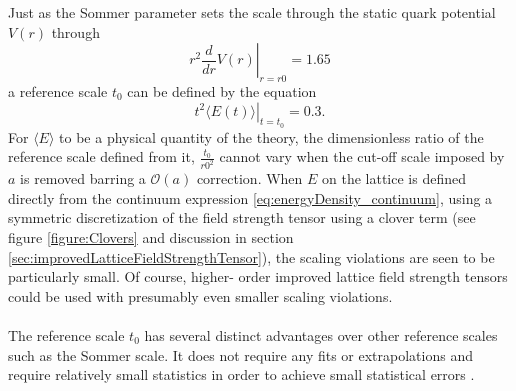 \documentclass[a4paper,10pt]{article}
\begin{document}
Just as the Sommer parameter sets the scale through the static quark potential $V(r)$ through
\begin{equation}
r^2\left.\frac{d}{d r} V(r)\right|_{r=r0} = 1.65
\end{equation}
a reference scale $t_0$ can be defined by the equation
\begin{equation}
\left.t^{2}\langle E(t)\rangle\right|_{t=t_{0}}=0.3.
\end{equation}
For $\langle E\rangle$ to be a physical quantity of the theory, the dimensionless ratio of the reference scale defined from it, $\frac{t_0}{r0^2}$ cannot vary when the cut-off scale imposed by $a$ is removed barring a $\mathcal{O}(a)$ correction. When $E$ on the lattice is defined directly from the continuum expression \eqref{eq:energyDensity_continuum}, using a symmetric discretization of the field strength tensor using a clover term (see figure \ref{figure:Clovers} and discussion in section \ref{sec:improvedLatticeFieldStrengthTensor}), the scaling violations are seen to be particularly small. Of course, higher- order improved lattice field strength tensors could be used with presumably even smaller scaling violations.\\\\
The reference scale $t_0$ has several distinct advantages over other reference scales such as the Sommer scale. It does not require any fits or extrapolations and require relatively small statistics in order to achieve small statistical errors \cite{Luscher2010}.
\end{document}
